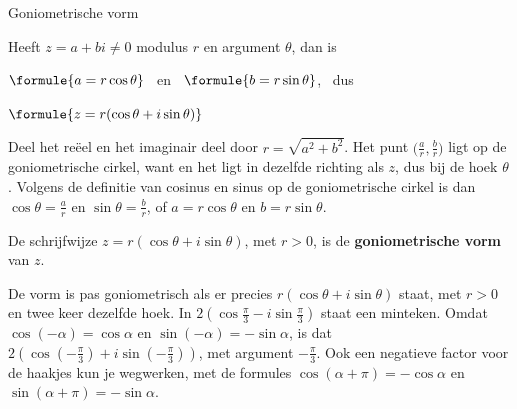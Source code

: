 \begin{theorie}
\begin{stelling}{Goniometrische vorm}
\begin{minipage}[t]{.6\linewidth}
\vspace{0pt}
Heeft $z = a + bi \neq 0$ modulus $r$ en argument $\theta$, dan is

\vspace{1mm}
\qquad $\formule{a = r\cos\theta}$ \ en \ $\formule{b = r\sin\theta}$, \ dus

\vspace{1mm}
\qquad $\formule{z = r(\cos\theta + i\sin\theta)}$
\end{minipage}\hfill
\begin{minipage}[t]{.36\linewidth}
\vspace{0pt}
\end{minipage}
\end{stelling}

\begin{bewijs}
Deel het reëel en het imaginair deel door $r = \sqrt{a^2 + b^2}$. Het punt $\bigl(\frac{a}{r}, \frac{b}{r}\bigr)$ ligt op de goniometrische cirkel, want
en het ligt in dezelfde richting als $z$, dus bij de hoek $\theta$. Volgens de definitie van cosinus en sinus op de goniometrische cirkel is dan $\cos\theta = \frac{a}{r}$ en $\sin\theta = \frac{b}{r}$, of $a = r\cos\theta$ en $b = r\sin\theta$.
\end{bewijs}

De schrijfwijze $z = r(\cos\theta + i\sin\theta)$, met $r > 0$, is de \textbf{\textcolor{accent}{goniometrische vorm}} van $z$.
\end{theorie}

De vorm is pas goniometrisch als er precies $r(\cos\theta + i\sin\theta)$ staat, met $r > 0$ en twee keer dezelfde hoek. In $2(\cos\frac{\pi}{3} - i\sin\frac{\pi}{3})$ staat een minteken. Omdat $\cos(-\alpha) = \cos\alpha$ en $\sin(-\alpha) = -\sin\alpha$, is dat $2(\cos(-\frac{\pi}{3}) + i\sin(-\frac{\pi}{3}))$, met argument $-\frac{\pi}{3}$. Ook een negatieve factor voor de haakjes kun je wegwerken, met de formules $\cos(\alpha + \pi) = -\cos\alpha$ en $\sin(\alpha + \pi) = -\sin\alpha$.

